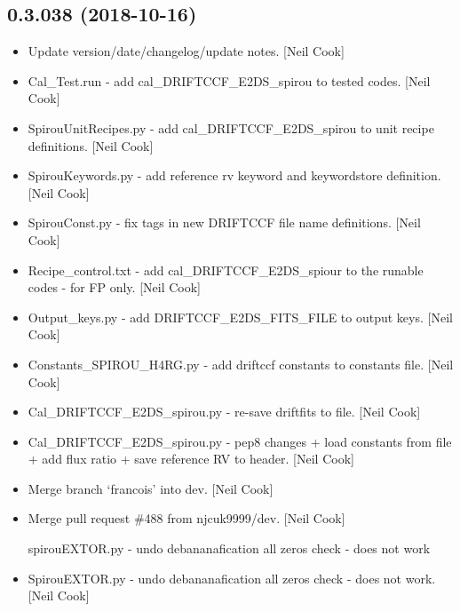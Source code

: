 \documentclass[a4paper,10pt,english]{report}
\begin{document}
\subsection{0.3.038 (2018-10-16)}
\label{\detokenize{misc/changelog:id290}}\begin{itemize}
\item {} 
Update version/date/changelog/update notes. {[}Neil Cook{]}

\item {} 
Cal\_Test.run - add cal\_DRIFTCCF\_E2DS\_spirou to tested codes. {[}Neil
Cook{]}

\item {} 
SpirouUnitRecipes.py - add cal\_DRIFTCCF\_E2DS\_spirou to unit recipe
definitions. {[}Neil Cook{]}

\item {} 
SpirouKeywords.py - add reference rv keyword and keywordstore
definition. {[}Neil Cook{]}

\item {} 
SpirouConst.py - fix tags in new DRIFTCCF file name definitions. {[}Neil
Cook{]}

\item {} 
Recipe\_control.txt - add cal\_DRIFTCCF\_E2DS\_spiour to the runable codes
- for FP only. {[}Neil Cook{]}

\item {} 
Output\_keys.py - add DRIFTCCF\_E2DS\_FITS\_FILE to output keys. {[}Neil
Cook{]}

\item {} 
Constants\_SPIROU\_H4RG.py - add driftccf constants to constants file.
{[}Neil Cook{]}

\item {} 
Cal\_DRIFTCCF\_E2DS\_spirou.py - re-save driftfits to file. {[}Neil Cook{]}

\item {} 
Cal\_DRIFTCCF\_E2DS\_spirou.py - pep8 changes + load constants from file
+ add flux ratio + save reference RV to header. {[}Neil Cook{]}

\item {} 
Merge branch ‘francois’ into dev. {[}Neil Cook{]}

\item {} 
Merge pull request \#488 from njcuk9999/dev. {[}Neil Cook{]}

spirouEXTOR.py - undo debananafication all zeros check - does not work

\item {} 
SpirouEXTOR.py - undo debananafication all zeros check - does not
work. {[}Neil Cook{]}

\end{itemize}
\end{document}
